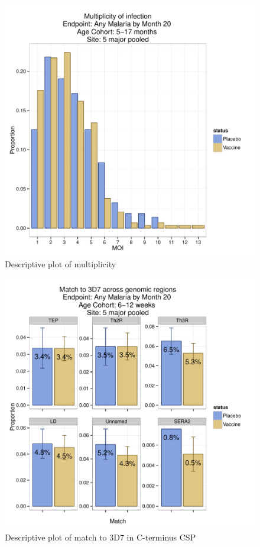 \documentclass[]{article}
\begin{document}
\begin{figure}[htbp]
\centering
\includegraphics{figures/moi-infant-x-1.pdf}
\caption{Descriptive plot of multiplicity}
\end{figure}

\begin{figure}[htbp]
\centering
\includegraphics{figures/match-newborn-x-1.pdf}
\caption{Descriptive plot of match to 3D7 in C-terminus CSP}
\end{figure}
\end{document}
